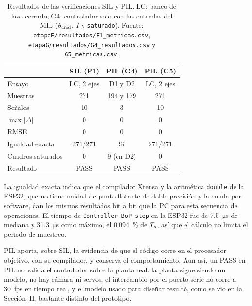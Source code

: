 \begin{table}[!t]
\caption{Resultados de las verificaciones SIL y PIL. LC: banco de lazo cerrado; G4: controlador
solo con las entradas del MIL ($\theta_{\mathrm{cmd}}$, $I$ y \texttt{saturado}). Fuente:
\texttt{etapaF/resultados/F1\_metricas.csv}, \texttt{etapaG/resultados/G4\_resultados.csv} y
\texttt{G5\_metricas.csv}.}
\label{tab:silpil}
\centering
\footnotesize
\setlength{\tabcolsep}{3pt}
\begin{tabular}{@{}lccc@{}}
\toprule
 & \textbf{SIL (F1)} & \textbf{PIL (G4)} & \textbf{PIL (G5)} \\
\midrule
Ensayo & LC, 2 ejes & D1 y D2 & LC, 2 ejes \\
Muestras & 271 & 194 y 179 & 271 \\
Señales & 10 & 3 & 10 \\
$\max|\Delta|$ & 0 & 0 & 0 \\
RMSE & 0 & 0 & 0 \\
Igualdad exacta & 271/271 & Sí & 271/271 \\
Cuadros saturados & 0 & 9 (en D2) & 0 \\
\midrule
Resultado & PASS & PASS & PASS \\
\bottomrule
\end{tabular}
\end{table}

La igualdad exacta indica que el compilador Xtensa y la aritmética \texttt{double} de la ESP32,
que no tiene unidad de punto flotante de doble precisión y la emula por software, dan los mismos
resultados bit a bit que la PC para esta secuencia de operaciones. El tiempo de
\texttt{Controller\_BoP\_step} en la ESP32 fue de \SI{7.5}{\micro\second} de mediana y
\SI{31.3}{\micro\second} como máximo, el \SI{0.094}{\percent} de $T_s$, así que el cálculo no
limita el periodo de muestreo.

PIL aporta, sobre SIL, la evidencia de que el código corre en el procesador objetivo, con su
compilador, y conserva el comportamiento. Aun así, un PASS en PIL no valida el controlador sobre
la planta real: la planta sigue siendo un modelo, no hay cámara ni servos, el intercambio por el
puerto serie no corre a \SI{30}{fps} en tiempo real, y el modelo usado para diseñar resultó, como
se vio en la Sección~II, bastante distinto del prototipo.
